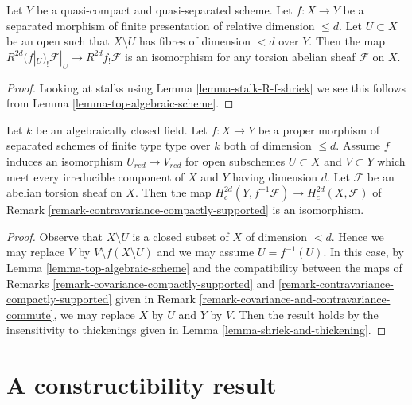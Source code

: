 \begin{lemma}
\label{lemma-top-restrict-to-open}
Let $Y$ be a quasi-compact and quasi-separated scheme.
Let $f : X \to Y$ be a separated morphism of finite presentation
of relative dimension $\leq d$. Let $U \subset X$ be an open
such that $X \setminus U$ has fibres of dimension $< d$ over $Y$.
Then the map $R^{2d}(f|_U)_!\mathcal{F}|_U \to R^{2d}f_!\mathcal{F}$
is an isomorphism for any torsion abelian sheaf $\mathcal{F}$ on $X$.
\end{lemma}

\begin{proof}
Looking at stalks using Lemma \ref{lemma-stalk-R-f-shriek}
we see this follows from
Lemma \ref{lemma-top-algebraic-scheme}.
\end{proof}

\begin{lemma}
\label{lemma-pullback-top-algebraic-scheme}
Let $k$ be an algebraically closed field. Let $f : X \to Y$ be a
proper morphism of separated schemes of finite type type over $k$ both
of dimension $\leq d$. Assume $f$ induces an isomorphism
$U_{red} \to V_{red}$ for open subschemes $U \subset X$ and $V \subset Y$
which meet every irreducible component of $X$ and $Y$ having dimension $d$.
Let $\mathcal{F}$ be an abelian torsion sheaf on $X$.
Then the map $H^{2d}_c(Y, f^{-1}\mathcal{F}) \to H^{2d}_c(X, \mathcal{F})$
of Remark \ref{remark-contravariance-compactly-supported}
is an isomorphism.
\end{lemma}

\begin{proof}
Observe that $X \setminus U$ is a closed subset of $X$ of dimension $< d$.
Hence we may replace $V$ by $V \setminus f(X \setminus U)$ and we may assume
$U = f^{-1}(U)$. In this case, by Lemma \ref{lemma-top-algebraic-scheme}
and the compatibility between the maps of
Remarks \ref{remark-covariance-compactly-supported} and
\ref{remark-contravariance-compactly-supported} given in
Remark \ref{remark-covariance-and-contravariance-commute},
we may replace $X$ by $U$ and $Y$ by $V$.
Then the result holds by the insensitivity to
thickenings given in Lemma \ref{lemma-shriek-and-thickening}.
\end{proof}










\section{A constructibility result}
\label{section-family-smooth-curves-cohomology}

